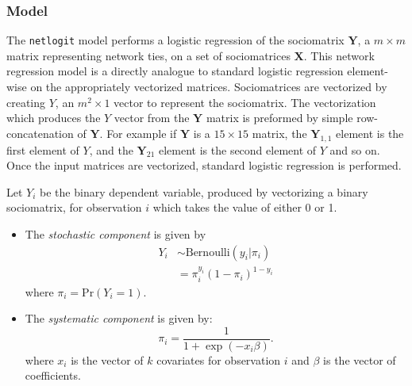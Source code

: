 \subsubsection{Model}
The {\tt netlogit} model performs a logistic regression of the
sociomatrix $\mathbf{Y}$, a $m \times m$ matrix representing network
ties, on a set of sociomatrices $\mathbf{X}$. This network regression
model is a directly analogue to standard logistic regression
element-wise on the appropriately vectorized matrices. Sociomatrices
are vectorized by creating $Y$, an $m^{2} \times 1$ vector to
represent the sociomatrix. The vectorization which produces the $Y$
vector from the $\mathbf{Y}$ matrix is preformed by simple
row-concatenation of $\mathbf{Y}$. For example if $\mathbf{Y}$ is a
$15 \times 15$ matrix, the $\mathbf{Y}_{1,1}$ element is the first
element of $Y$, and the $\mathbf{Y}_{21}$ element is the second
element of $Y$ and so on. Once the input matrices are vectorized,
standard logistic regression is performed.

Let $Y_{i}$ be the binary dependent variable, produced by vectorizing
a binary sociomatrix, for observation $i$ which takes the value of
either 0 or 1.
\begin{itemize}
\item The \emph{stochastic component} is given by 
\begin{eqnarray*}
Y_{i} & \sim \text{Bernoulli} (y_{i} | \pi_{i})\\
& = \pi_{i}^{y_{i}} (1 - \pi_{i})^{1 - y_{i}}
\end{eqnarray*}
where $\pi_{i} = \text{Pr}(Y_{i} = 1)$.
\item The \emph{systematic component} is given by:
\begin{equation*}
\pi_{i} = \frac{1}{1 + \exp(-x_{i}\beta)}.
\end{equation*}
where $x_{i}$ is the vector of $k$ covariates for observation $i$ and
$\beta$ is the vector of coefficients.
\end{itemize}

